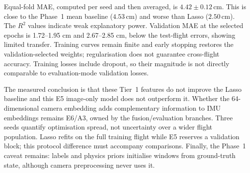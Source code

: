 Equal-fold MAE, computed per seed and then averaged, is
$4.42\pm0.12\,\mathrm{cm}$. This is close to the Phase~1 mean baseline
($4.53\,\mathrm{cm}$) and worse than Lasso ($2.50\,\mathrm{cm}$). The
$R^2$ values indicate weak explanatory power. Validation MAE at the selected
epochs is 1.72--1.95 cm and 2.67--2.85 cm, below the test-flight errors,
showing limited transfer. Training curves remain finite and early stopping
restores the validation-selected weights; regularisation does not guarantee
cross-flight accuracy. Training losses include dropout, so their magnitude
is not directly comparable to evaluation-mode validation losses.

The measured conclusion is that these Tier~1 features do not improve the
Lasso baseline and this E5 image-only model does not outperform it. Whether
the 64-dimensional camera embedding adds complementary information to IMU
embeddings remains E6/A3, owned by the fusion/evaluation branches. Three
seeds quantify optimisation spread, not uncertainty over a wider flight
population. Lasso refits on the full training flight while E5 reserves a
validation block; this protocol difference must accompany comparisons.
Finally, the Phase~1 caveat remains: labels and physics priors initialise
windows from ground-truth state, although camera preprocessing never uses it.

